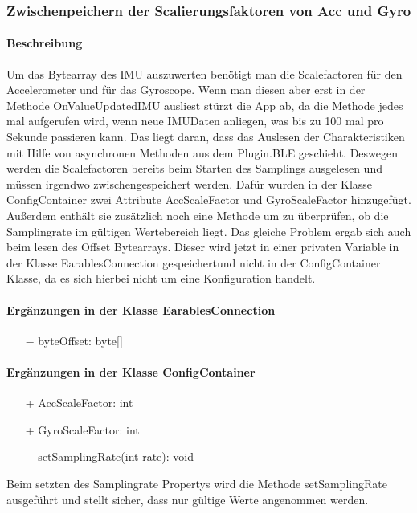 \documentclass[a4paper,12pt]{article}
\begin{document}
\subsubsection{Zwischenpeichern der Scalierungsfaktoren von Acc und Gyro}
\paragraph{Beschreibung}
Um das Bytearray des IMU auszuwerten benötigt man die Scalefactoren für den Accelerometer und für das Gyroscope. Wenn man diesen aber erst in der Methode OnValueUpdatedIMU ausliest stürzt die App ab, da die Methode jedes mal aufgerufen wird, wenn neue IMUDaten anliegen, was bis zu 100 mal pro Sekunde passieren kann. Das liegt daran, dass das Auslesen der Charakteristiken mit Hilfe von asynchronen Methoden aus dem Plugin.BLE geschieht. Deswegen werden die Scalefactoren bereits beim Starten des Samplings ausgelesen und müssen irgendwo zwischengespeichert werden. Dafür wurden in der Klasse ConfigContainer zwei Attribute AccScaleFactor und GyroScaleFactor hinzugefügt. Außerdem enthält sie zusätzlich noch eine Methode um zu überprüfen, ob die Samplingrate im gültigen Wertebereich liegt. Das gleiche Problem ergab sich auch beim lesen des Offset Bytearrays. Dieser wird jetzt in einer privaten Variable in der Klasse EarablesConnection gespeichertund nicht in der ConfigContainer Klasse, da es sich hierbei nicht um eine Konfiguration handelt.

\paragraph{Ergänzungen in der Klasse EarablesConnection}
\begin{itemize}
	\item[$-$] byteOffset: byte[]
\end{itemize}

\paragraph{Ergänzungen in der Klasse ConfigContainer}
\begin{itemize}
	\item[+] AccScaleFactor: int 
	\item[+] GyroScaleFactor: int
	\item[$-$]  setSamplingRate(int rate): void 
\end{itemize}
Beim setzten des Samplingrate Propertys wird die Methode setSamplingRate ausgeführt und stellt sicher, dass nur gültige Werte angenommen werden.
\end{document}
